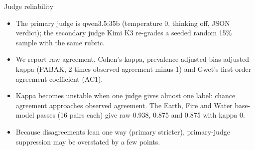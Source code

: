 \documentclass[aspectratio=169,11pt,usepdftitle=false]{beamer}
\begin{document}
\begin{frame}{Judge reliability}
{\begin{itemize}
\item The primary judge is qwen3.5:35b (temperature 0, thinking off, JSON verdict); the secondary judge Kimi K3 re-grades a seeded random 15\% sample with the same rubric.
\item We report raw agreement, Cohen's kappa, prevalence-adjusted bias-adjusted kappa (PABAK, 2 times observed agreement minus 1) and Gwet's first-order agreement coefficient (AC1).
\item Kappa becomes unstable when one judge gives almost one label: chance agreement approaches observed agreement. The Earth, Fire and Water base-model passes (16 pairs each) give raw 0.938, 0.875 and 0.875 with kappa 0.
\item Because disagreements lean one way (primary stricter), primary-judge suppression may be overstated by a few points.
\end{itemize}}
\end{frame}
\end{document}
